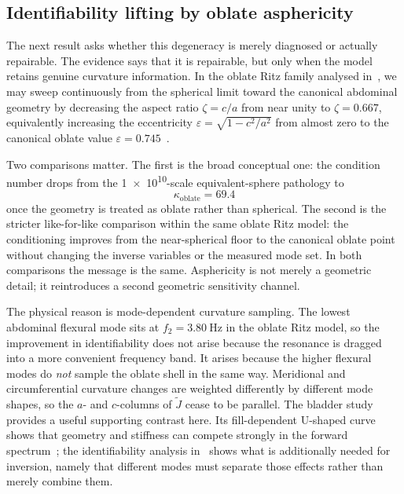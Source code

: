 \subsection{Identifiability lifting by oblate asphericity}

The next result asks whether this degeneracy is merely diagnosed or
actually repairable.  The evidence says that it is repairable, but only when
the model retains genuine curvature information.  In the oblate Ritz family
analysed in~\cite{BrowntoneP8}, we may sweep continuously from the spherical limit toward the canonical
abdominal geometry by decreasing the aspect ratio $\zeta=c/a$ from near unity
to $\zeta=0.667$, equivalently increasing the eccentricity
$\varepsilon=\sqrt{1-c^2/a^2}$ from almost zero to the canonical oblate value
$\varepsilon=0.745$~\cite{BrowntoneP8}.

Two comparisons matter.  The first is the broad conceptual one: the condition
number drops from the \num{1e10}-scale equivalent-sphere pathology to
\begin{equation}
  \kappa_\mathrm{oblate} = 69.4
\end{equation}
once the geometry is treated as oblate rather than spherical.  The second is
the stricter like-for-like comparison within the same oblate Ritz model: the
conditioning improves from the near-spherical floor to the canonical oblate
point without changing the inverse variables or the measured mode set.  In both
comparisons the message is the same.  Asphericity is not merely a geometric detail; it
reintroduces a second geometric sensitivity channel.

The physical reason is mode-dependent curvature sampling.  The lowest abdominal
flexural mode sits at $f_2=\SI{3.80}{\hertz}$ in the oblate Ritz model,
so the improvement in identifiability does not arise because the resonance is
dragged into a more convenient frequency band.  It arises because the higher
flexural modes do \emph{not} sample the oblate shell in the same way.  Meridional
and circumferential curvature changes are weighted differently by different
mode shapes, so the $a$- and $c$-columns of $\widetilde{J}$ cease to be parallel.  The
bladder study provides a useful supporting contrast here.  Its fill-dependent
U-shaped curve shows that geometry and stiffness can compete strongly in the
forward spectrum~\cite{BrowntoneP4}; the identifiability analysis in~\cite{BrowntoneP8}
shows what is additionally needed
for inversion, namely that different modes must separate those effects rather
than merely combine them.

